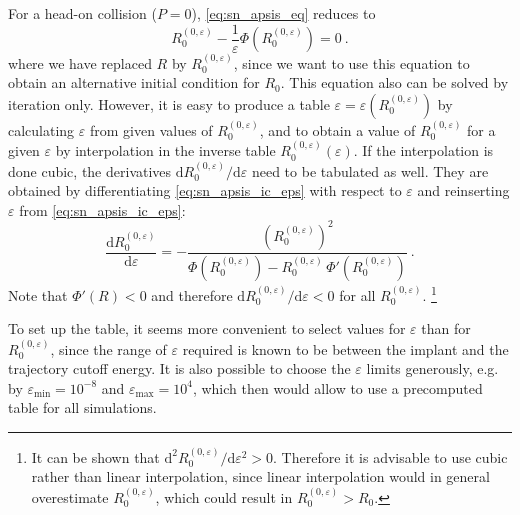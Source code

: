 For a head-on collision ($P = 0$), \cref{eq:sn_apsis_eq} reduces to
%
\begin{equation}
    \label{eq:sn_apsis_ic_eps}
    R_0^{(0,\varepsilon)} - \frac{ 1 }{ \varepsilon } \Phi(R_0^{(0,\varepsilon)}) = 0 ~.
\end{equation}
%
where we have replaced \(R\) by \(R_0^{(0,\varepsilon)}\), since we want to use this equation to obtain an alternative initial condition for $R_0$.
This equation also can be solved by iteration only.
However, it is easy to produce a table \(\varepsilon = \varepsilon(R_0^{(0,\varepsilon)})\) by calculating $\varepsilon$ from given values of $R_0^{(0,\varepsilon)}$, and to obtain a value of \(R_0^{(0,\varepsilon)}\) for a given $\varepsilon$ by interpolation in the inverse table \(R_0^{(0,\varepsilon)}(\varepsilon)\).
If the interpolation is done cubic, the derivatives \(\mathrm{d} R_0^{(0,\varepsilon)} / \mathrm{d} \varepsilon\) need to be tabulated as well. They are obtained by differentiating \cref{eq:sn_apsis_ic_eps} with respect to $\varepsilon$ and reinserting $\varepsilon$ from \cref{eq:sn_apsis_ic_eps}:
%
\begin{equation}
    \frac{ \mathrm{d} R_0^{(0,\varepsilon)} }{ \mathrm{d} \varepsilon } =
        - \frac{ (R_0^{(0,\varepsilon)})^2 }{ \Phi(R_0^{(0,\varepsilon)}) - R_0^{(0,\varepsilon)} \, \Phi'(R_0^{(0,\varepsilon)}) } ~.
\end{equation}
%
Note that $\Phi'(R) < 0$ and therefore $\mathrm{d} R_0^{(0,\varepsilon)} / \mathrm{d} \varepsilon < 0$ for all $R_0^{(0,\varepsilon)}$.%
%
\footnote{It can be shown that $\mathrm{d}^2 R_0^{(0,\varepsilon)} / \mathrm{d} \varepsilon^2 > 0$. Therefore it is advisable to use cubic rather than linear interpolation, since linear interpolation would in general overestimate $R_0^{(0,\varepsilon)}$, which could result in $R_0^{(0,\varepsilon)} > R_0$.
}

To set up the table, it seems more convenient to select values for $\varepsilon$ than for $R_0^{(0,\varepsilon)}$, since the range of \(\varepsilon\) required is known to be between the implant and the trajectory cutoff energy.
It is also possible to choose the \(\varepsilon\) limits generously, e.g. by \(\varepsilon_\mathrm{min} = 10^{-8}\) and \(\varepsilon_\mathrm{max} = 10^4\), which then would allow to use a precomputed table for all simulations.

